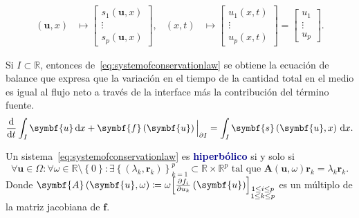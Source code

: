 \begin{definition}
\begin{align*}
		\left(\symbf{u},x\right)                             &
		\longmapsto
		\begin{bmatrix}
			s_{1}\left(\symbf{u},x\right) \\
			\vdots                        \\
			s_{p}\left(\symbf{u},x\right)
		\end{bmatrix},                     &
		\left(x,t\right)                                     &
		\longmapsto
		\begin{bmatrix}
			u_{1}\left(x,t\right) \\
			\vdots                \\
			u_{p}\left(x,t\right)
		\end{bmatrix}=
		\begin{bmatrix}
			u_{1}  \\
			\vdots \\
			u_{p}
		\end{bmatrix}.
	\end{align*}
\end{definition}
Si $I\subset\mathbb{R}$, entonces
de~\eqref{eq:systemofconservationlaw} se obtiene la ecuación de
balance que expresa que la variación en el tiempo de la cantidad
total en el medio es igual al flujo neto a través de la interface
más la contribución del término fuente.
\begin{equation*}
	\diff{}{t}
	\int_{I}\symbf{u}\dl x+
	{\symbf{f}\left(\symbf{u}\right)\Big|}_{\partial I}=
	\int_{I}\symbf{s}\left(\symbf{u},x\right)\dl x.
\end{equation*}

\begin{definition}
	Un sistema~\eqref{eq:systemofconservationlaw} es
	\textcolor{DarkBlue}{\bfseries hiperbólico} si y
	solo si
	\begin{equation}
		\forall\symbf{u}\in\Omega\!:
		\forall\omega\in\mathbb{R}\setminus\left\{0\right\}\!:
		\exists
		{\left\{
			\left(\lambda_{k},\symbf{r}_{k}\right)
			\right\}}^{p}_{k=1}\subset
		\mathbb{R}\times\mathbb{R}^{p}
		\text{ tal que }
		\symbf{A}\left(\symbf{u},\omega\right)
		\symbf{r}_{k}=
		\lambda_{k}
		\symbf{r}_{k}.
	\end{equation}
	Donde
	\begin{math}
		\symbf{A}\left(\symbf{u},\omega\right)\coloneqq
		\omega
		{
			\begin{bmatrix}
				\diffp{f_{i}}{u_{k}}
				\left(\symbf{u}\right)
			\end{bmatrix}}_{\substack{1\leq i\leq p\\1\leq k\leq p}}
	\end{math}
	es un múltiplo de la matriz jacobiana de $\mathbf{f}$.
\end{definition}

